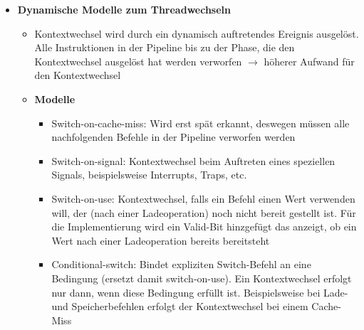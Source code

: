 \begin{itemize}
	\item \textbf{Dynamische Modelle zum Threadwechseln}
	\begin{itemize}
		\item Kontextwechsel wird durch ein dynamisch auftretendes Ereignis ausgelöst. Alle Instruktionen in der Pipeline bis zu der Phase, die den Kontextwechsel ausgelöst hat werden verworfen \(\rightarrow\) höherer Aufwand für den Kontextwechsel
		\item \textbf{Modelle}
		\begin{itemize}
			\item Switch-on-cache-miss: Wird erst spät erkannt, deswegen müssen alle nachfolgenden Befehle in der Pipeline verworfen werden
			\item Switch-on-signal: Kontextwechsel beim Auftreten eines speziellen Signals, beispielsweise Interrupts, Traps, etc.
			\item Switch-on-use: Kontextwechsel, falls ein Befehl einen Wert verwenden will, der (nach einer Ladeoperation) noch nicht bereit gestellt ist. Für die Implementierung wird ein Valid-Bit hinzgefügt das anzeigt, ob ein Wert nach einer Ladeoperation bereits bereitsteht
			\item Conditional-switch: Bindet expliziten Switch-Befehl an eine Bedingung (ersetzt damit switch-on-use). Ein Kontextwechsel erfolgt nur dann, wenn diese Bedingung erfüllt ist. Beispielsweise bei Lade- und Speicherbefehlen erfolgt der Kontextwechsel bei einem Cache-Miss
		\end{itemize}
	\end{itemize}
\end{itemize}

